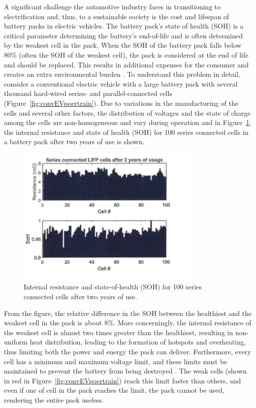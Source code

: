 \documentclass{article}
\begin{document}
A significant challenge the automotive industry faces in transitioning to electrification and, thus, to a sustainable society is the cost and lifespan of battery packs in electric vehicles. The battery pack's state of health (SOH) is a critical parameter determining the battery's end-of-life and is often determined by the weakest cell in the pack. When the SOH of the battery pack falls below 80\% (often the SOH of the weakest cell), the pack is considered at the end of life and should be replaced. This results in additional expenses for the consumer and creates an extra environmental burden \cite{canals2022electric}. To understand this problem in detail, consider a conventional electric vehicle with a large battery pack with several thousand hard-wired series- and parallel-connected cells (Figure~\ref{fig:convEVpoertrain}). Due to variations in the manufacturing of the cells and several other factors, the distribution of voltages and the state of charge among the cells are non-homogeneous and vary during operation \cite{schuster2015lithium} and in Figure~\ref{fig:IR_SOC_dist}, the internal resistance and state of health (SOH) for 100 series connected cells in a battery pack after two years of use is shown.
\begin{figure}[!b]
    \centering
    \includegraphics[width=0.8\textwidth]{Figures/SOC_IR_dist.png}
    \caption{Internal resistance and state-of-health (SOH) for 100 series connected cells after two years of use.}
    \label{fig:IR_SOC_dist}
\end{figure}
From the figure, the relative difference in the SOH between the healthiest and the weakest cell in the pack is about 8\%. More concerningly, the internal resistance of the weakest cell is almost two times greater than the healthiest, resulting in non-uniform heat distribution, leading to the formation of hotspots and overheating, thus limiting both the power and energy the pack can deliver. Furthermore, every cell has a minimum and maximum voltage limit, and these limits must be maintained to prevent the battery from being destroyed \cite{garche2018electrochemical}. The weak cells (shown in red in Figure~\ref{fig:convEVpoertrain}) reach this limit faster than others, and even if one of cell in the pack reaches the limit, the pack cannot be used, rendering the entire pack useless.
\end{document}
